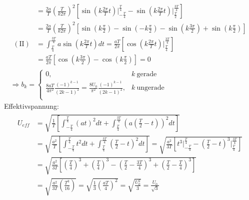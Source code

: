 \begin{gather}
\begin{aligned}
            &= \frac{2a}{T}\left(\frac{T}{k2\pi}\right)^2 \left[\sin(k \frac{2\pi}{T} t) \bigg \vert^{\frac{T}{4}}_{-\frac{T}{4}} - \sin(k \frac{2\pi}{T} t) \bigg \vert^{\frac{3T}{4}}_{\frac{T}{2}}\right]\\
            &= \frac{2a}{T}\left(\frac{T}{k2\pi}\right)^2 \left[\sin(k\frac{\pi}{2}) - \sin(-k\frac{\pi}{2}) - \sin(k\frac{3\pi}{2}) + \sin(k\frac{\pi}{2})\right]\\[0,5cm]
        (\text{II}) &= \int^{\frac{3T}{4}}_{\frac{T}{4}}a\sin(k \frac{2\pi}{T} t)dt = \frac{aT}{2\pi} \left[\cos(k\frac{2\pi}{T}t)\bigg \vert^{\frac{3T}{4}}_{\frac{T}{4}}\right]\\
                    &= \frac{aT}{2\pi} \left[\cos(k\frac{3\pi}{2}) - \cos(k\frac{\pi}{2})\right] = 0
    \end{aligned}\\[0,5cm]
    \Rightarrow b_k =
    \begin{cases}
        0, & k~\text{gerade}\\
        \frac{8aT}{4\pi^2}\frac{(-1)^{k-1}}{(2k-1)^2} = \frac{8U_0}{\pi^2}\frac{(-1)^{k-1}}{(2k-1)^2}, & k~\text{ungerade}\\
    \end{cases}
\end{gather}
Effektivspannung:
\begin{gather}
    \begin{aligned}
        U_{eff} &= \sqrt{\frac{1}{T}\left[\int^{\frac{T}{4}}_{-\frac{T}{4}} (at)^2dt + \int^{\frac{3T}{4}}_{\frac{T}{4}} \left(a\left(\frac{T}{2}-t\right)\right)^2 dt\right]}\\
                &= \sqrt{\frac{a^2}{T}\left[\int^{\frac{T}{4}}_{-\frac{T}{4}} t^2dt + \int^{\frac{3T}{4}}_{\frac{T}{4}} \left(\frac{T}{2}-t\right)^2 dt\right]}
                = \sqrt{\frac{a^2}{3T}\left[t^3 \bigg \vert^{\frac{T}{4}}_{-\frac{T}{4}} - \left(\frac{T}{2}-t\right)^3 \bigg \vert^{\frac{3T}{4}}_{\frac{T}{4}}\right]}\\
                &= \sqrt{\frac{a^2}{3T}\left[\left(\frac{T}{4}\right)^3 + \left(\frac{T}{4}\right)^3 - \left(\frac{T}{2}- \frac{3T}{4} \right)^3 +  \left(\frac{T}{2}- \frac{T}{4} \right)^3\right]}\\
                &= \sqrt{\frac{a^2}{3T}\left(\frac{T^3}{16}\right)} = \sqrt{\frac{1}{3}\left(\frac{aT}{4}\right)^2} = \sqrt{\frac{U_0^2}{3}} = \frac{U_0}{\sqrt{3}}
     \end{aligned}
\end{gather}